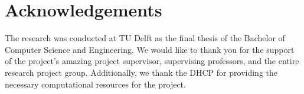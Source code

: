 \section{Acknowledgements}
\label{sec:acknowledgements}

The research was conducted at TU Delft as the final thesis of the Bachelor of Computer Science and Engineering. We would like to thank you for the support of the project's amazing project supervisor, supervising professors, and the entire research project group. Additionally, we thank the DHCP \cite{DHPC2024} for providing the necessary computational resources for the project.